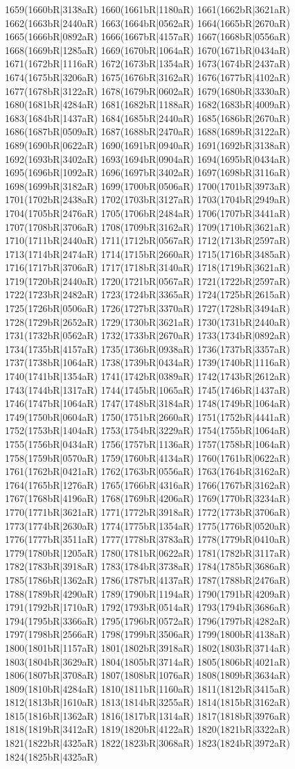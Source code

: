 1659(1660bR|3138aR) 1660(1661bR|1180aR) 1661(1662bR|3621aR) 1662(1663bR|2440aR) 1663(1664bR|0562aR) 1664(1665bR|2670aR) 1665(1666bR|0892aR) 1666(1667bR|4157aR) 1667(1668bR|0556aR) 1668(1669bR|1285aR) 1669(1670bR|1064aR) 1670(1671bR|0434aR) 1671(1672bR|1116aR) 1672(1673bR|1354aR) 1673(1674bR|2437aR) 1674(1675bR|3206aR) 1675(1676bR|3162aR) 1676(1677bR|4102aR) 1677(1678bR|3122aR) 1678(1679bR|0602aR) 1679(1680bR|3330aR) 1680(1681bR|4284aR) 1681(1682bR|1188aR) 1682(1683bR|4009aR) 1683(1684bR|1437aR) 1684(1685bR|2440aR) 1685(1686bR|2670aR) 1686(1687bR|0509aR) 1687(1688bR|2470aR) 1688(1689bR|3122aR) 1689(1690bR|0622aR) 1690(1691bR|0940aR) 1691(1692bR|3138aR) 1692(1693bR|3402aR) 1693(1694bR|0904aR) 1694(1695bR|0434aR) 1695(1696bR|1092aR) 1696(1697bR|3402aR) 1697(1698bR|3116aR) 1698(1699bR|3182aR) 1699(1700bR|0506aR) 1700(1701bR|3973aR) 1701(1702bR|2438aR) 1702(1703bR|3127aR) 1703(1704bR|2949aR) 1704(1705bR|2476aR) 1705(1706bR|2484aR) 1706(1707bR|3441aR) 1707(1708bR|3706aR) 1708(1709bR|3162aR) 1709(1710bR|3621aR) 1710(1711bR|2440aR) 1711(1712bR|0567aR) 1712(1713bR|2597aR) 1713(1714bR|2474aR) 1714(1715bR|2660aR) 1715(1716bR|3485aR) 1716(1717bR|3706aR) 1717(1718bR|3140aR) 1718(1719bR|3621aR) 1719(1720bR|2440aR) 1720(1721bR|0567aR) 1721(1722bR|2597aR) 1722(1723bR|2482aR) 1723(1724bR|3365aR) 1724(1725bR|2615aR) 1725(1726bR|0506aR) 1726(1727bR|3370aR) 1727(1728bR|3494aR) 1728(1729bR|2652aR) 1729(1730bR|3621aR) 1730(1731bR|2440aR) 1731(1732bR|0562aR) 1732(1733bR|2670aR) 1733(1734bR|0892aR) 1734(1735bR|4157aR) 1735(1736bR|0938aR) 1736(1737bR|3357aR) 1737(1738bR|1064aR) 1738(1739bR|0434aR) 1739(1740bR|1116aR) 1740(1741bR|1354aR) 1741(1742bR|0389aR) 1742(1743bR|2612aR) 1743(1744bR|1317aR) 1744(1745bR|1065aR) 1745(1746bR|1437aR) 1746(1747bR|1064aR) 1747(1748bR|3184aR) 1748(1749bR|1064aR) 1749(1750bR|0604aR) 1750(1751bR|2660aR) 1751(1752bR|4441aR) 1752(1753bR|1404aR) 1753(1754bR|3229aR) 1754(1755bR|1064aR) 1755(1756bR|0434aR) 1756(1757bR|1136aR) 1757(1758bR|1064aR) 1758(1759bR|0570aR) 1759(1760bR|4134aR) 1760(1761bR|0622aR) 1761(1762bR|0421aR) 1762(1763bR|0556aR) 1763(1764bR|3162aR) 1764(1765bR|1276aR) 1765(1766bR|4316aR) 1766(1767bR|3162aR) 1767(1768bR|4196aR) 1768(1769bR|4206aR) 1769(1770bR|3234aR) 1770(1771bR|3621aR) 1771(1772bR|3918aR) 1772(1773bR|3706aR) 1773(1774bR|2630aR) 1774(1775bR|1354aR) 1775(1776bR|0520aR) 1776(1777bR|3511aR) 1777(1778bR|3783aR) 1778(1779bR|0410aR) 1779(1780bR|1205aR) 1780(1781bR|0622aR) 1781(1782bR|3117aR) 1782(1783bR|3918aR) 1783(1784bR|3738aR) 1784(1785bR|3686aR) 1785(1786bR|1362aR) 1786(1787bR|4137aR) 1787(1788bR|2476aR) 1788(1789bR|4290aR) 1789(1790bR|1194aR) 1790(1791bR|4209aR) 1791(1792bR|1710aR) 1792(1793bR|0514aR) 1793(1794bR|3686aR) 1794(1795bR|3366aR) 1795(1796bR|0572aR) 1796(1797bR|4282aR) 1797(1798bR|2566aR) 1798(1799bR|3506aR) 1799(1800bR|4138aR) 1800(1801bR|1157aR) 1801(1802bR|3918aR) 1802(1803bR|3714aR) 1803(1804bR|3629aR) 1804(1805bR|3714aR) 1805(1806bR|4021aR) 1806(1807bR|3708aR) 1807(1808bR|1076aR) 1808(1809bR|3634aR) 1809(1810bR|4284aR) 1810(1811bR|1160aR) 1811(1812bR|3415aR) 1812(1813bR|1610aR) 1813(1814bR|3255aR) 1814(1815bR|3162aR) 1815(1816bR|1362aR) 1816(1817bR|1314aR) 1817(1818bR|3976aR) 1818(1819bR|3412aR) 1819(1820bR|4122aR) 1820(1821bR|3322aR) 1821(1822bR|4325aR) 1822(1823bR|3068aR) 1823(1824bR|3972aR) 1824(1825bR|4325aR) 